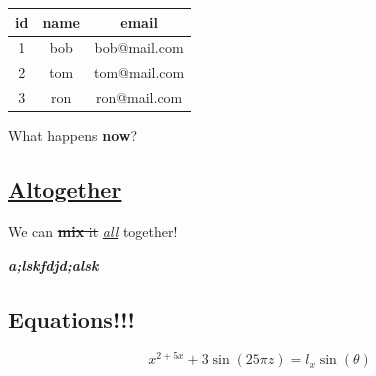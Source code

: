 \documentclass{article}
\begin{document}
\noindent
\begin{tabular}{| c | c | c |}
\hline 
id
&name
&email
\\
\hline 
1
&bob
&bob@mail.com
\\
\hline 
2
&tom
&tom@mail.com
\\
\hline 
3
&ron
&ron@mail.com
\\
\hline 
\end{tabular}

What happens \textbf{now}?

\subsection{\underline{Altogether}}

We can \sout{\textbf{mix} it}  \underline{\textit{all}} together!

\textit{\textbf{a;lskfdjd;alsk}}

\subsection{Equations!!!}

\begin{equation}
{{x^{2+{5 x}}}+{3 {\sin({25 {\pi z}})}}}={l_{x} {\sin(\theta)}}
\end{equation}
\end{document}
